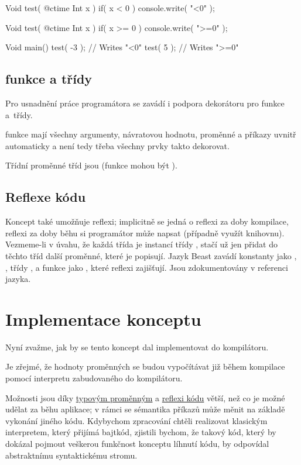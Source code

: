 \begin{code}
Void test( @ctime Int x )
	if( x < 0 )
{
	console.write( "<0" );
}

Void test( @ctime Int x )
	if( x >= 0 )
{
	console.write( ">=0" );
}

Void main() {
	test( -3 ); // Writes "<0"
	test( 5 ); // Writes ">=0"
}
\end{code}

\subsection{\ctime funkce a třídy}
Pro usnadnění práce programátora se zavádí i podpora dekorátoru  pro funkce a~třídy.

\ctime funkce mají všechny argumenty, návratovou hodnotu, proměnné a příkazy uvnitř automaticky \ctime a není tedy třeba všechny prvky takto dekorovat.

Třídní proměnné \ctime tříd jsou \ctime (funkce mohou být \nonctime).

\subsection{Reflexe kódu} \label{ctime:reflection}
Koncept také umožňuje reflexi; implicitně se jedná o reflexi za doby kompilace, reflexi za doby běhu si programátor může napsat (případně využít knihovnu). Vezmeme-li v úvahu, že každá třída je instancí \ctime třídy , stačí už jen přidat do těchto tříd další \ctime proměnné, které je popisují. Jazyk Beast zavádí \ctime konstanty jako , , třídy ,  a funkce jako , které reflexi zajišťují. Jsou zdokumentovány v referenci jazyka.

\section{Implementace konceptu} \label{ctime:orderInterpreters}
Nyní zvažme, jak by se tento koncept dal implementovat do kompilátoru.

Je zřejmé, že hodnoty \ctime proměnných se budou vypočítávat již během kompilace pomocí interpretu zabudovaného do kompilátoru.

Možnosti \ctime jsou díky \hyperref[ctime:typeVars]{typovým proměnným} a \hyperref[ctime:reflection]{reflexi kódu} větší, než co je možné udělat za běhu aplikace; v rámci \ctime se sémantika příkazů může měnit na základě vykonání jiného \ctime kódu. Kdybychom zpracování \ctime chtěli realizovat klasickým interpretem, který přijímá bajtkód, zjistili bychom, že takový kód, který by dokázal pojmout veškerou funkčnost konceptu líhnutí kódu, by odpovídal abstraktnímu syntaktickému stromu.

